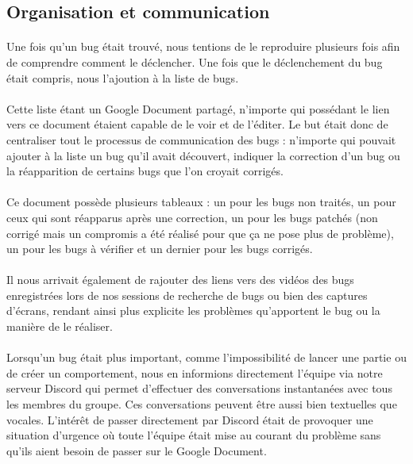 \documentclass{report}
\begin{document}
\subsection{Organisation et communication}
\paragraph{}
  Une fois qu’un bug était trouvé, nous tentions de le reproduire plusieurs fois afin de comprendre comment le déclencher. Une fois que le déclenchement du bug était compris, nous l’ajoution à la liste de bugs.
\paragraph{}
  Cette liste étant un Google Document partagé, n’importe qui possédant le lien vers ce document étaient capable de le voir et de l’éditer. Le but était donc de centraliser tout le processus de communication des bugs : n’importe qui pouvait ajouter à la liste un bug qu’il avait découvert, indiquer la correction d'un bug ou la réapparition de certains bugs que l'on croyait corrigés.
\paragraph{}
  Ce document possède plusieurs tableaux : un pour les bugs non traités, un pour ceux qui sont réapparus après une correction, un pour les bugs patchés (non corrigé mais un compromis a été réalisé pour que ça ne pose plus de problème), un pour les bugs à vérifier et un dernier pour les bugs corrigés.
\paragraph{}
Il nous arrivait également de rajouter des liens vers des vidéos des bugs enregistrées lors de nos sessions de recherche de bugs ou bien des captures d’écrans, rendant ainsi plus explicite les problèmes qu’apportent le bug ou la manière de le réaliser.
\paragraph{}
Lorsqu’un bug était plus important, comme l’impossibilité de lancer une partie ou de créer un comportement, nous en informions directement l’équipe via notre serveur Discord qui permet d’effectuer des conversations instantanées avec tous les membres du groupe. Ces conversations peuvent être aussi bien textuelles que vocales. L’intérêt de passer directement par Discord était de provoquer une situation d’urgence où toute l’équipe était mise au courant du problème sans qu’ils aient besoin de passer sur le Google Document. 
\end{document}
